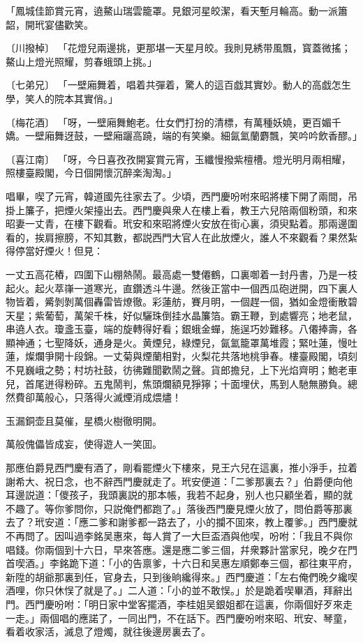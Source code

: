 \begin{myquote}
「鳳城佳節賞元宵，遶鰲山瑞雲籠罩。見銀河星皎潔，看天塹月輪高。動一派簫韶，開玳宴儘歡笑。

{\markfont〔川撥棹〕}
「花燈兒兩邊挑，更那堪一天星月皎。我則見綉带風飄，寳蓋微搖；鰲山上燈光照耀，剪春蛾頭上挑。」

{\markfont〔七弟兄〕}
「一壁廂舞着，唱着共彈着，驚人的這百戯其實妙。動人的高戯怎生學，笑人的院本其實俏。」

{\markfont〔梅花酒〕}
「呀，一壁廂舞鮑老。仕女們打扮的清標，有萬種妖嬈，更百媚千嬌。一壁廂舞迓鼓，一壁廂躧高蹺，端的有笑樂。細氤氳蘭麝飄，笑吟吟飲香醪。」

{\markfont〔喜江南〕}
「呀，今日喜孜孜開宴賞元宵，玉纖慢撥紫檀槽。燈光明月兩相耀，照樓臺殿閣，今日個開懷沉醉楽淘淘。」
\end{myquote}

唱畢，喫了元宵，韓道國先往家去了。少頃，西門慶吩咐來昭將樓下開了兩間，吊掛上簾子，把煙火架擡出去。西門慶與衆人在樓上看，教王六兒陪兩個粉頭，和來昭妻一丈青，在樓下觀看。玳安和來昭將煙火安放在街心裏，須臾點着。那兩邊圍看的，挨肩擦膀，不知其數，都説西門大官人在此放煙火，誰人不來觀看？果然紮得停當好煙火！但見：

\begin{myquote}
一丈五高花樁，四圍下山棚熱鬧。最高處一雙僊鶴，口裏啣着一封丹書，乃是一枝起火。起火萃嵂一道寒光，直鑽透斗牛邊。然後正當中一個西瓜砲迸開，四下裏人物皆着，觱剝剝萬個轟雷皆燎徹。彩蓮舫，賽月明，一個趕一個，猶如金燈衝散碧天星；紫葡萄，萬架千株，好似驪珠倒挂水晶簾箔。霸王鞭，到處響亮；地老鼠，串遶人衣。瓊盞玉臺，端的旋轉得好看；銀蛾金蟬，施逞巧妙難移。八僊捧壽，各顯神通；七聖降妖，通身是火。黄煙兒，綠煙兒，氤氳籠罩萬堆霞；緊吐蓮，慢吐蓮，燦爛爭開十段錦。一丈菊與煙蘭相對，火梨花共落地桃爭春。樓臺殿閣，頃刻不見巍峨之勢；村坊社鼓，彷彿難聞歡鬧之聲。貨郎擔兒，上下光焰齊明；鮑老車兒，首尾迸得粉碎。五鬼鬧判，焦頭爛額見猙獰；十面埋伏，馬到人馳無勝負。總然費卻萬般心，只落得火滅煙消成煨燼！

玉漏銅壶且莫催，星橋火樹徹明開。

萬般傀儡皆成妄，使得遊人一笑囬。
\end{myquote}

那應伯爵見西門慶有酒了，剛看罷煙火下樓來，見王六兒在這裏，推小淨手，拉着謝希大、祝日念，也不辭西門慶就走了。玳安便道：「二爹那裏去？」伯爵便向他耳邊説道：「儍孩子，我頭裏説的那本帳，我若不起身，别人也只顧坐着，顯的就不趣了。等你爹問你，只説俺們都跑了。」落後西門慶見煙火放了，問伯爵等那裏去了？玳安道：「應二爹和謝爹都一路去了，小的攔不囬來，教上覆爹。」西門慶就不再問了。因叫過李銘吴惠來，每人賞了一大巨盃酒與他喫，吩咐：「我且不與你唱錢。你兩個到十六日，早來答應。還是應二爹三個，幷衆夥計當家兒，晚夕在門首喫酒。」李銘跪下道：「小的告禀爹，十六日和吴惠左順鄭奉三個，都往東平府，新陞的胡爺那裏到任，官身去，只到後晌纔得來。」西門慶道：「左右俺們晚夕纔喫酒哩，你只休悮了就是了。」二人道：「小的並不敢悮。」於是跪着喫畢酒，拜辭出門。西門慶吩咐：「明日家中堂客擺酒，李桂姐吴銀姐都在這裏，你兩個好歹來走一走。」兩個唱的應諾了，一同出門，不在話下。西門慶吩咐來昭、玳安、琴童，看着收家活，滅息了燈燭，就往後邊房裏去了。

